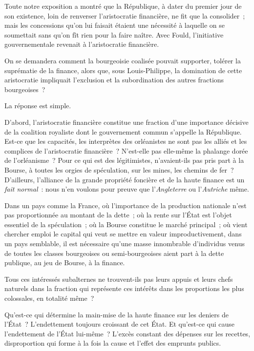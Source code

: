 \documentclass[french,twoside]{book} %
\begin{document}
Toute notre exposition a montré que la République, à dater du premier jour de son existence, loin de renverser l’aristocratie financière, ne fit que la consolider ; mais les concessions qu’on lui faisait étaient une nécessité à laquelle on se soumettait sans qu’on fît rien pour la faire naître. Avec Fould, l’initiative gouvernementale revenait à l’aristocratie financière.\par
On se demandera comment la bourgeoisie coalisée pouvait supporter, tolérer la suprématie de la finance, alors que, sous Louis-Philippe, la domination de cette aristocratie impliquait l’exclusion et la subordination des autres fractions bourgeoises ?\par
La réponse est simple.\par
D’abord, l’aristocratie financière constitue une fraction d’une importance décisive de la coalition royaliste dont le gouvernement commun s’appelle la République. Est-ce que les capacités, les interprètes des orléanistes ne sont pas les alliés et les complices de l’aristocratie financière ? N’est-elle pas elle-même la phalange dorée de l’orléanisme ? Pour ce qui est des légitimistes, n’avaient-ils pas pris part à la Bourse, à toutes les orgies de spéculation, sur les mines, les chemins de fer ? D’ailleurs, l’alliance de la grande propriété foncière et de la haute finance est un \emph{fait normal} : nous n’en voulons pour preuve que l’\emph{Angleterre} ou l’\emph{Autriche} même.\par
Dans un pays comme la France, où l’importance de la production nationale n’est pas proportionnée au montant de la dette ; où la rente sur l’État est l’objet essentiel de la spéculation ; où la Bourse constitue le marché principal ; où vient chercher emploi le capital qui veut se mettre en valeur improductivement, dans un pays semblable, il est nécessaire qu’une masse innombrable d’individus venus de toutes les classes bourgeoises ou semi-bourgeoises aient part à la dette publique, au jeu de Bourse, à la finance.\par
Tous ces intéressés subalternes ne trouvent-ils pas leurs appuis et leurs chefs naturels dans la fraction qui représente ces intérêts dans les proportions les plus colossales, en totalité même ?\par
Qu’est-ce qui détermine la main-mise de la haute finance sur les deniers de l’État ? L’endettement toujours croissant de cet État. Et qu’est-ce qui cause l’endettement de l’État lui-même ? L’excès constant des dépenses sur les recettes, disproportion qui forme à la fois la cause et l’effet des emprunts publics.\par
\end{document}
